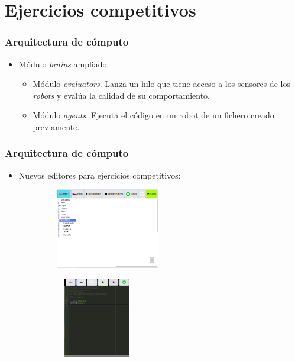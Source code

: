 \documentclass[xcolor={table}]{beamer}
\begin{document}
		\section{Ejercicios competitivos}
		\begin{frame}
			\frametitle{Arquitectura de cómputo}
			\begin{itemize}
			    \item Módulo \textit{brains} ampliado:
			    \begin{itemize}\itemsep5pt
			        \item Módulo \textit{evaluators}. Lanza un hilo que tiene acceso a los sensores de los \textit{robots} y evalúa la calidad de su comportamiento.
			        \item  Módulo \textit{agents}. Ejecuta el código en un robot de un fichero creado previamente. 
			    \end{itemize}
			\end{itemize}
		\end{frame}
		
		\begin{frame}
			\frametitle{Arquitectura de cómputo}
			\begin{itemize}
			     \item Nuevos editores para ejercicios competitivos:
			\end{itemize}
				\begin{figure}[H]
                \centering
                \begin{subfigure}{\textwidth}
                 \includegraphics[width=5cm, height=3.5cm]{img/competitivoEditorScratch.png}
                 \label{fig:ir}
                \end{subfigure}
                \begin{subfigure}{\textwidth}
                 \includegraphics[width=4cm, height=3.5cm]{img/competitiveEditorJavascript.png}
                \label{fig:vision}
                \end{subfigure}
                \end{figure}
		\end{frame}
		
\end{document}
